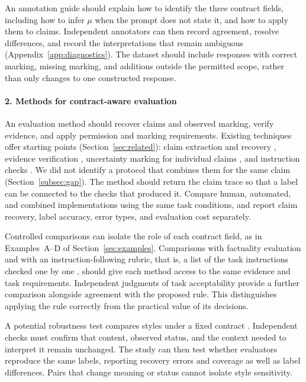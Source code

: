 \documentclass{clv2025}
\begin{document}
An annotation guide should explain how to identify the three contract fields,
including how to infer $\mu$ when the prompt does not state it, and how to
apply them to claims. Independent annotators can then record agreement,
resolve differences, and record the interpretations that remain ambiguous
(Appendix~\ref{app:diagnostics}). The dataset should include responses with correct marking, missing
marking, and additions outside the permitted scope, rather than only changes
to one constructed response.

\paragraph{2. Methods for contract-aware evaluation}
An evaluation method should recover claims and observed marking, verify
evidence, and apply permission and marking requirements. Existing
techniques offer starting points (Section~\ref{sec:related}): claim
extraction and recovery
\citep{min_factscore_2023,metropolitansky_claimify_2025,choi_decontextualization_2021},
evidence verification \citep{min_factscore_2023,song_veriscore_2024},
uncertainty marking for individual claims \citep{yang_logu_2025}, and
instruction checks \citep{zhou_ifeval_2023,lee_mcjudgebench_2026}.
We did not identify a protocol that combines them for the same claim
(Section~\ref{subsec:gap}). The method should return the claim trace so that
a label can be connected to the checks that produced it. Compare human, automated, and combined implementations using the same
task conditions, and report claim recovery, label accuracy, error types,
and evaluation cost separately.

Controlled comparisons can isolate the role of each contract field, as in
Examples~A--D of Section~\ref{sec:examples}. Comparisons with factuality
evaluation and with an instruction-following rubric, that is, a list of the
task instructions checked one by one \citep{lee_mcjudgebench_2026},
should give each method access to the same evidence and task requirements. Independent
judgments of task acceptability provide a further comparison alongside
agreement with the proposed rule. This distinguishes applying the rule
correctly from the practical value of its decisions.

A potential robustness test compares styles under a fixed contract
\citep{rao_dear_2018,briakou_evaluating_2021,feuer_style_2025,lyu_converge_2026}.
Independent checks must confirm that content, observed status, and the
context needed to interpret it remain unchanged. The study can then test
whether evaluators reproduce the same labels, reporting recovery errors
and coverage as well as label differences. Pairs that change meaning or
status cannot isolate style sensitivity.
\end{document}
